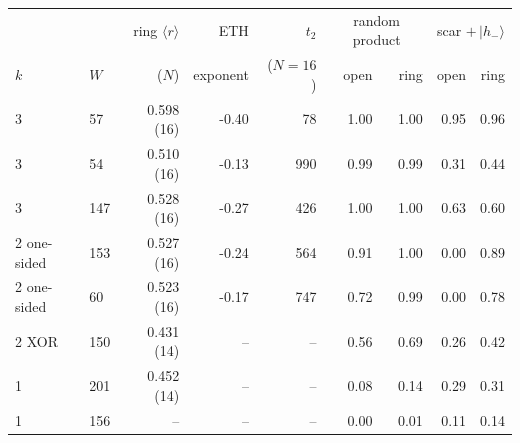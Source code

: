 \begin{tabular}{llrrrrrrr}
\toprule
 & & ring $\langle r\rangle$ & ETH & $t_2$ & \multicolumn{2}{c}{random product} & \multicolumn{2}{c}{scar $+\,|h_-\rangle$} \\
$k$ & $W$ & ($N$) & exponent & ($N=16$) & open & ring & open & ring \\
\midrule
3 & 57 & 0.598 (16) & -0.40 & 78 & 1.00 & 1.00 & 0.95 & 0.96 \\
3 & 54 & 0.510 (16) & -0.13 & 990 & 0.99 & 0.99 & 0.31 & 0.44 \\
3 & 147 & 0.528 (16) & -0.27 & 426 & 1.00 & 1.00 & 0.63 & 0.60 \\
2 one-sided & 153 & 0.527 (16) & -0.24 & 564 & 0.91 & 1.00 & 0.00 & 0.89 \\
2 one-sided & 60 & 0.523 (16) & -0.17 & 747 & 0.72 & 0.99 & 0.00 & 0.78 \\
2 XOR & 150 & 0.431 (14) & -- & -- & 0.56 & 0.69 & 0.26 & 0.42 \\
1 & 201 & 0.452 (14) & -- & -- & 0.08 & 0.14 & 0.29 & 0.31 \\
1 & 156 & -- & -- & -- & 0.00 & 0.01 & 0.11 & 0.14 \\
\bottomrule
\end{tabular}
